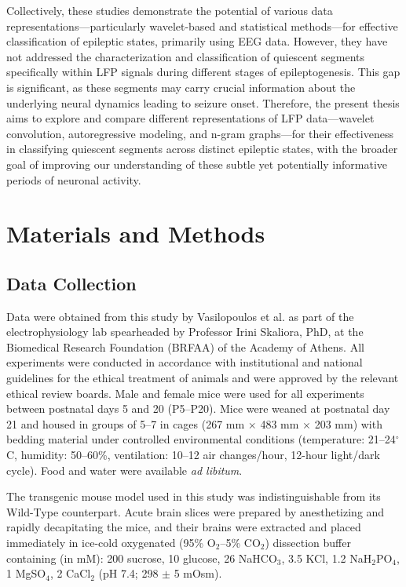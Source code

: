 \documentclass{article}
\begin{document}
Collectively, these studies demonstrate the potential of various data representations—particularly wavelet-based and statistical methods—for effective classification of epileptic states, primarily using EEG data. However, they have not addressed the characterization and classification of quiescent segments specifically within LFP signals during different stages of epileptogenesis. This gap is significant, as these segments may carry crucial information about the underlying neural dynamics leading to seizure onset. Therefore, the present thesis aims to explore and compare different representations of LFP data—wavelet convolution, autoregressive modeling, and n-gram graphs—for their effectiveness in classifying quiescent segments across distinct epileptic states, with the broader goal of improving our understanding of these subtle yet potentially informative periods of neuronal activity.

\section{Materials and Methods}
\subsection{Data Collection}
Data were obtained from this study \cite{vasilopoulos2023} by Vasilopoulos et al. as part of the electrophysiology lab spearheaded by Professor Irini Skaliora, PhD, at the Biomedical Research Foundation (BRFAA) of the Academy of Athens. All experiments were conducted in accordance with institutional and national guidelines for the ethical treatment of animals and were approved by the relevant ethical review boards. Male and female mice were used for all experiments between postnatal days 5 and 20 (P5--P20). Mice were weaned at postnatal day 21 and housed in groups of 5--7 in cages (267 mm $\times$ 483 mm $\times$ 203 mm) with bedding material under controlled environmental conditions (temperature: 21--24$^{\circ}$C, humidity: 50--60\%, ventilation: 10--12 air changes/hour, 12-hour light/dark cycle). Food and water were available \textit{ad libitum}.

The transgenic mouse model used in this study was indistinguishable from its Wild-Type counterpart. Acute brain slices were prepared by anesthetizing and rapidly decapitating the mice, and their brains were extracted and placed immediately in ice-cold oxygenated (95\% O$_2$--5\% CO$_2$) dissection buffer containing (in mM): 200 sucrose, 10 glucose, 26 NaHCO$_3$, 3.5 KCl, 1.2 NaH$_2$PO$_4$, 1 MgSO$_4$, 2 CaCl$_2$ (pH 7.4; 298 $\pm$ 5 mOsm).
\end{document}
